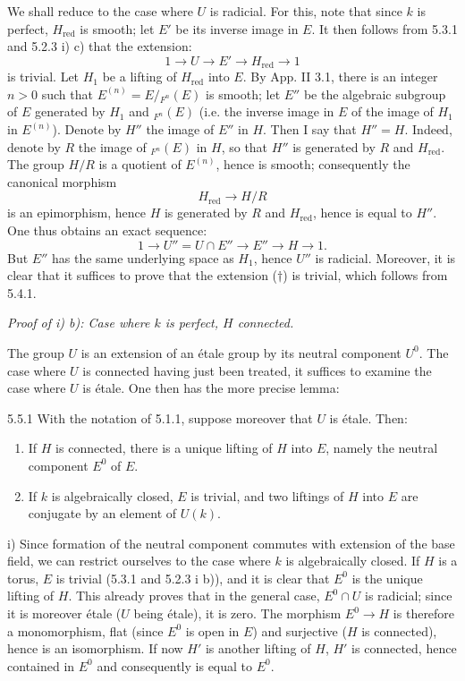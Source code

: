 We shall reduce to the case where $U$ is radicial. For this, note that since $k$ is perfect, $H_{\mathrm{red}}$ is smooth; let $E'$ be its inverse image in $E$. It then follows from 5.3.1 and 5.2.3 i) c) that the extension:
\[
 1\to U\to E'\to H_{\mathrm{red}}\to1
\]
is trivial. Let $H_1$ be a lifting of $H_{\mathrm{red}}$ into $E$. By App. II 3.1, there is an integer $n>0$ such that $E^{(n)}=E/{}_{F^n}(E)$ is smooth; let $E''$ be the algebraic subgroup of $E$ generated by $H_1$ and ${}_{F^n}(E)$ (i.e. the inverse image in $E$ of the image of $H_1$ in $E^{(n)}$). Denote by $H''$ the image of $E''$ in $H$. Then I say that $H''=H$. Indeed, denote by $R$ the image of ${}_{F^n}(E)$ in $H$, so that $H''$ is generated by $R$ and $H_{\mathrm{red}}$. The group $H/R$ is a quotient of $E^{(n)}$, hence is smooth; consequently the canonical morphism
\[
 H_{\mathrm{red}}\to H/R
\]
is an epimorphism, hence $H$ is generated by $R$ and $H_{\mathrm{red}}$, hence is equal to $H''$. One thus obtains an exact sequence:
\[
 1\to U''=U\cap E''\to E''\to H\to1.\tag{$\dagger$}
\]
But $E''$ has the same underlying space as $H_1$, hence $U''$ is radicial. Moreover, it is clear that it suffices to prove that the extension ($\dagger$) is trivial, which follows from 5.4.1.

\noindent\emph{Proof of i) b): Case where $k$ is perfect, $H$ connected.}

The group $U$ is an extension of an étale group by its neutral component $U^0$. The case where $U$ is connected having just been treated, it suffices to examine the case where $U$ is étale. One then has the more precise lemma:
\begin{lemma}{5.5.1}\label{XVII.5.5.1}
With the notation of 5.1.1, suppose moreover that $U$ is étale. Then:
\begin{enumerate}[label=\textup{\roman*)}]
\item If $H$ is connected, there is a unique lifting of $H$ into $E$, namely the neutral component $E^0$ of $E$.
\item If $k$ is algebraically closed, $E$ is trivial, and two liftings of $H$ into $E$ are conjugate by an element of $U(k)$.
\end{enumerate}
\end{lemma}
i) Since formation of the neutral component commutes with extension of the base field, we can restrict ourselves to the case where $k$ is algebraically closed. If $H$ is a torus, $E$ is trivial (5.3.1 and 5.2.3 i b)), and it is clear that $E^0$ is the unique lifting of $H$. This already proves that in the general case, $E^0\cap U$ is radicial; since it is moreover étale ($U$ being étale), it is zero. The morphism $E^0\to H$ is therefore a monomorphism, flat (since $E^0$ is open in $E$) and surjective ($H$ is connected), hence is an isomorphism. If now $H'$ is another lifting of $H$, $H'$ is connected, hence contained in $E^0$ and consequently is equal to $E^0$.

